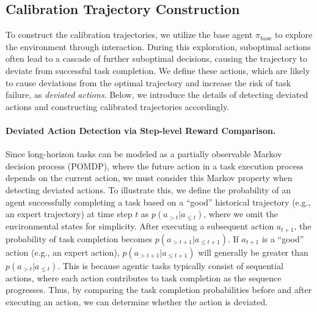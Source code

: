 \subsection{Calibration Trajectory Construction}
\label{sec3.2}

To construct the calibration trajectories, we utilize the base agent $\pi_{\text{base}}$ to explore the environment through interaction. During this exploration, suboptimal actions often lead to a cascade of further suboptimal decisions, causing the trajectory to deviate from successful task completion. 
We define these actions, which are likely to cause deviations from the optimal trajectory and increase the risk of task failure, as \textit{deviated actions}. 
Below, we introduce the details of detecting deviated actions and constructing calibrated trajectories accordingly.


\paragraph{Deviated Action Detection via Step-level Reward Comparison.}

Since long-horizon tasks can be modeled as a partially observable Markov decision process (POMDP), where the future action in a task execution process depends on the current action, we must consider this Markov property when detecting deviated actions. 
To illustrate this, we define the probability of an agent successfully completing a task based on a ``good'' historical trajectory (e.g., an expert trajectory) at time step $t$ as $p(a_{>t}|a_{\leq t})$, where we omit the environmental states for simplicity.
After executing a subsequent action $a_{t+1}$, the probability of task completion becomes $p(a_{>t+1}|a_{\leq t+1})$. If $a_{t+1}$ is a ``good'' action (e.g., an expert action), $p(a_{>t+1}|a_{\leq t+1})$ will generally be greater than $p(a_{>t}|a_{\leq t})$. 
This is because agentic tasks typically consist of sequential actions, where each action contributes to task completion as the sequence progresses. 
Thus, by comparing the task completion probabilities before and after executing an action, we can determine whether the action is deviated.



